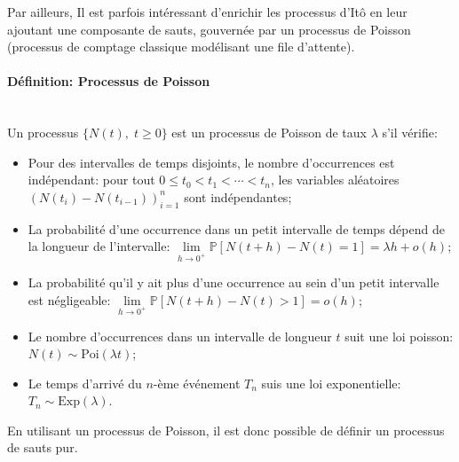 Par ailleurs, Il est parfois intéressant d'enrichir les processus d'Itô en leur ajoutant une composante de sauts, gouvernée par un processus de Poisson (processus de comptage classique modélisant une file d'attente).
\paragraph{Définition: Processus de Poisson}\mbox{}\\
Un processus $\{N(t),\;t\geq0\}$ est un processus de Poisson de taux $\lambda$ s'il vérifie:
\begin{itemize}
    \item Pour des intervalles de temps disjoints, le nombre d'occurrences est indépendant: pour tout $0 \leq t_0 < t_1 < \cdots < t_n$, les variables aléatoires ${\left(N(t_i) - N(t_{i-1})\right)}_{i=1}^n$ sont indépendantes;
    \item La probabilité d'une occurrence dans un petit intervalle de temps dépend de la longueur de l'intervalle: $\underset{h\to0^+}{\lim}\mathds{P}[N(t+h)-N(t)=1]=\lambda h+o(h)$;
    \item La probabilité qu'il y ait plus d'une occurrence au sein d'un petit intervalle est négligeable: $\underset{h\to0^+}{\lim}\mathds{P}[N(t+h)-N(t)>1]=o(h)$;
    \item Le nombre d'occurrences dans un intervalle de longueur $t$ suit une loi poisson: $N(t)\sim \text{Poi}(\lambda t)$;
    \item Le temps d'arrivé du $n$-ème événement $T_n$ suis une loi exponentielle: $T_n\sim\text{Exp}(\lambda)$.
\end{itemize}
En utilisant un processus de Poisson, il est donc possible de définir un processus de sauts pur.
